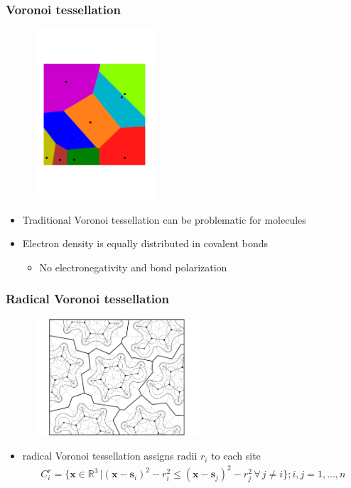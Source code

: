 \documentclass[t]{beamer}
\begin{document}
	\begin{frame}
	    \frametitle{Voronoi tessellation}
	    \begin{figure}
            \includegraphics[width=0.4\textwidth]{figures/Voronoi.pdf}
        \end{figure}
        \begin{itemize}
            \item Traditional Voronoi tessellation can be problematic for molecules \pause
            \item Electron density is equally distributed in covalent bonds
            \begin{itemize}\normalsize
                \item No electronegativity and bond polarization
            \end{itemize}
        \end{itemize}
	\end{frame}
	\begin{frame}
	    \frametitle{Radical Voronoi tessellation}
	    \begin{figure}
            \includegraphics[width=0.55\textwidth]{figures/MT_voronoi.pdf}
        \end{figure}
        \begin{itemize}
            \item radical Voronoi tessellation assigns radii $r_i$ to each site
            \begin{align*}
                C_i^r = \{ \mathbf{x} \in \mathbb{R}^3 \, | ( \mathbf{x} - \mathbf{s}_i )^2 - r_i^2 \leq ( \mathbf{x} - \mathbf{s}_j )^2 - r_j^2 \, \forall \, j \neq i \}; i,j=1,...,n
			\end{align*}
        \end{itemize}
	\end{frame}
\end{document}
